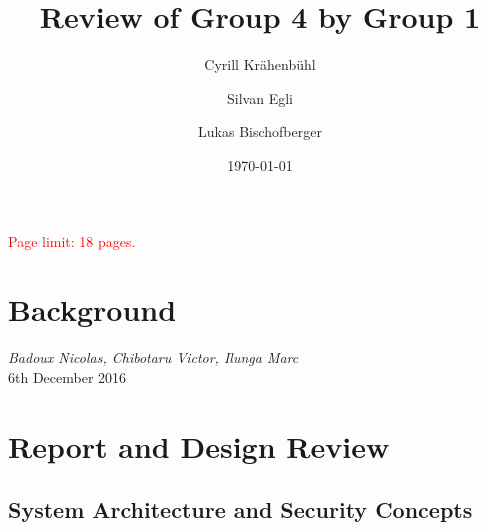 \documentclass[english]{article}
\title{\huge\sffamily\bfseries Review of Group 4 by Group 1}
\author{Cyrill Kr\"ahenb\"uhl \and Silvan Egli \and Lukas Bischofberger}
\date{\today}
\begin{document}
\maketitle

\begin{center}
{\large\textcolor{red}{Page limit: 18 pages.}}
\end{center}

\tableofcontents
\pagebreak



\section{Background}

 {\it Badoux Nicolas, Chibotaru Victor, Ilunga Marc} \\

 6th December 2016


\section{Report and Design Review}


\subsection{System Architecture and Security Concepts} %

\end{document}
